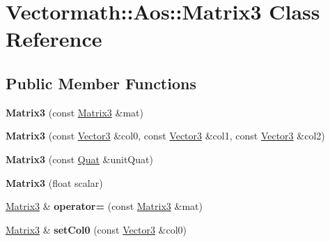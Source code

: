 \hypertarget{class_vectormath_1_1_aos_1_1_matrix3}{\section{Vectormath\+:\+:Aos\+:\+:Matrix3 Class Reference}
\label{class_vectormath_1_1_aos_1_1_matrix3}
}
\subsection*{Public Member Functions}
\begin{DoxyCompactItemize}
\item 
\hypertarget{class_vectormath_1_1_aos_1_1_matrix3_a70ed1efea22260aaf3feb09bfdae1cd1}{{\bfseries Matrix3} (const \hyperlink{class_vectormath_1_1_aos_1_1_matrix3}{Matrix3} \&mat)}\label{class_vectormath_1_1_aos_1_1_matrix3_a70ed1efea22260aaf3feb09bfdae1cd1}

\item 
\hypertarget{class_vectormath_1_1_aos_1_1_matrix3_ae2f8a0046818a2cd2d2c4be443e73cb1}{{\bfseries Matrix3} (const \hyperlink{class_vectormath_1_1_aos_1_1_vector3}{Vector3} \&col0, const \hyperlink{class_vectormath_1_1_aos_1_1_vector3}{Vector3} \&col1, const \hyperlink{class_vectormath_1_1_aos_1_1_vector3}{Vector3} \&col2)}\label{class_vectormath_1_1_aos_1_1_matrix3_ae2f8a0046818a2cd2d2c4be443e73cb1}

\item 
\hypertarget{class_vectormath_1_1_aos_1_1_matrix3_adc65495cc7d3528f539437ff760aee77}{{\bfseries Matrix3} (const \hyperlink{class_vectormath_1_1_aos_1_1_quat}{Quat} \&unit\+Quat)}\label{class_vectormath_1_1_aos_1_1_matrix3_adc65495cc7d3528f539437ff760aee77}

\item 
\hypertarget{class_vectormath_1_1_aos_1_1_matrix3_acbf606567d34e43be0b7a90544bd5153}{{\bfseries Matrix3} (float scalar)}\label{class_vectormath_1_1_aos_1_1_matrix3_acbf606567d34e43be0b7a90544bd5153}

\item 
\hypertarget{class_vectormath_1_1_aos_1_1_matrix3_ac44263902125a12ac01203e44b3fe32f}{\hyperlink{class_vectormath_1_1_aos_1_1_matrix3}{Matrix3} \& {\bfseries operator=} (const \hyperlink{class_vectormath_1_1_aos_1_1_matrix3}{Matrix3} \&mat)}\label{class_vectormath_1_1_aos_1_1_matrix3_ac44263902125a12ac01203e44b3fe32f}

\item 
\hypertarget{class_vectormath_1_1_aos_1_1_matrix3_a6f1fb862918de7039479584350fcb436}{\hyperlink{class_vectormath_1_1_aos_1_1_matrix3}{Matrix3} \& {\bfseries set\+Col0} (const \hyperlink{class_vectormath_1_1_aos_1_1_vector3}{Vector3} \&col0)}\label{class_vectormath_1_1_aos_1_1_matrix3_a6f1fb862918de7039479584350fcb436}


\end{DoxyCompactItemize}
